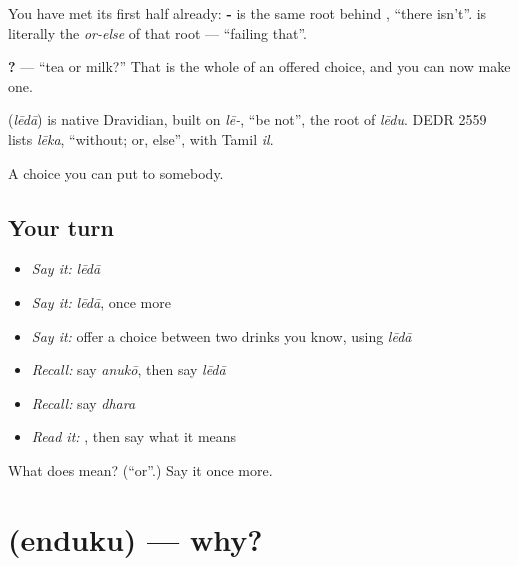 You have met its first half already: \textbf{-} is the same root behind , \textquotedblleft{}there isn't\textquotedblright{}.  is literally the \emph{or-else} of that root — \textquotedblleft{}failing that\textquotedblright{}.

\textbf{  ?} — \textquotedblleft{}tea or milk?\textquotedblright{} That is the whole of an offered choice, and you can now make one.

\begin{cousinweb}
\textbf{} (\emph{lēdā}) is native Dravidian, built on \emph{lē-}, \textquotedblleft{}be not\textquotedblright{}, the root of \emph{lēdu}. DEDR 2559 lists \emph{lēka}, \textquotedblleft{}without; or, else\textquotedblright{}, with Tamil \emph{il}.
\end{cousinweb}

\begin{grammarlens}[title={What you've built}]
A choice you can put to somebody.
\end{grammarlens}

\subsection*{Your turn}
\begin{itemize}
\raggedright
  \item \emph{Say it:} \emph{lēdā}
  \item \emph{Say it:} \emph{lēdā}, once more
  \item \emph{Say it:} offer a choice between two drinks you know, using \emph{lēdā}
  \item \emph{Recall:} say \emph{anukō}, then say \emph{lēdā}
  \item \emph{Recall:} say \emph{dhara}
  \item \emph{Read it:} \textbf{}, then say what it means
\end{itemize}

\begin{tcolorbox}[breakable,colback=teal!4,colframe=teal!35!black,title={Before you move on}]
What does  mean? (\textquotedblleft{}or\textquotedblright{}.) Say it once more.
\end{tcolorbox}
\section[\texorpdfstring{\te{ఎందుకు} (enduku)}{ఎందుకు (enduku)}]{ (enduku) — why?}

